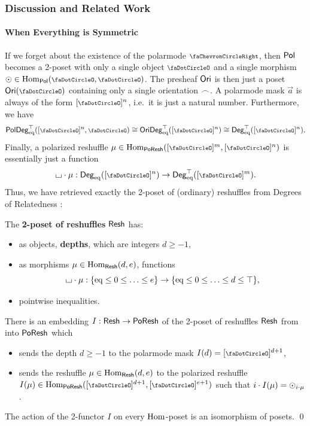 \documentclass[a4paper]{memoir}
\begin{document}
\subsubsection{Discussion and Related Work}
\paragraph{When Everything is Symmetric}
If we forget about the existence of the polarmode $\ypolar$, then ${\mathsf{Pol}}$ becomes a 2-poset with only a single object $\npolar$ and a single morphism $\nonpol \in \Hom_\polcat(\npolar, \npolar)$.
The presheaf ${\mathsf{Ori}}$ is then just a poset $\oripsh(\npolar)$ containing only a single orientation ${\frown}$.
A polarmode mask $\vec a$ is always of the form $[\npolar]^n$, i.e.\ it is just a natural number.
Furthermore, we have
\[
	\poldegeqtop([\npolar]^n, \npolar) \cong \oridegeqtop([\npolar]^n) \cong \Degeqtop([\npolar]^n).
\]
Finally, a polarized reshuffle $\mu \in \Hom_\poreshcat([\npolar]^m, [\npolar]^n)$ is essentially just a function
\[
	\loch \cdot \mu : \Degeq([\npolar]^n) \to \Degeqtop([\npolar]^m).
\]
Thus, we have retrieved exactly the 2-poset of (ordinary) reshuffles from Degrees of Relatedness \cite{reldtt,reldtt-techreport}:
\begin{definition}
	The \textbf{2-poset of reshuffles} $\mathsf{Resh}$ has:
	\begin{itemize}
		\item as objects, \textbf{depths}, which are integers $d \geq -1$,
		\item as morphisms $\mu \in {\mathrm{Hom}}_{\mathsf{Resh}}(d, e)$, functions
		\[
			{\llcorner\hspace{-.4ex}\lrcorner} \cdot \mu : \mathopen{}\left\{ {\mathrm{eq}} \leq 0 \leq \ldots \leq e \right\}\mathclose{} \to \mathopen{}\left\{ {\mathrm{eq}} \leq 0 \leq \ldots \leq d \leq \top \right\}\mathclose{},
		\]
		\item pointwise inequalities.
	\end{itemize}
\end{definition}
\begin{theorem} \label{thm:reshcat-poreshcat}
	There is an embedding $I : \mathsf{Resh} \to \mathsf{PoResh}$ of the 2-poset of reshuffles $\mathsf{Resh}$ from \cite[def.\ 6.2.7]{reldtt-techreport} into $\mathsf{PoResh}$ which
	\begin{itemize}
		\item sends the depth $d \geq -1$ to the polarmode mask $I(d) = [\npolar]^{d+1}$,
		\item sends the reshuffle $\mu \in {\mathrm{Hom}}_{\mathsf{Resh}}(d, e)$ to the polarized reshuffle $I(\mu) \in \Hom_\poreshcat([\npolar]^{d+1}, [\npolar]^{e+1})$
		such that $i \cdot I(\mu) = {{\odot}}_{i \cdot \mu}$.
	\end{itemize}
	The action of the 2-functor $I$ on every ${\mathrm{Hom}}$-poset is an isomorphism of posets. \qed
\end{theorem}
\end{document}
